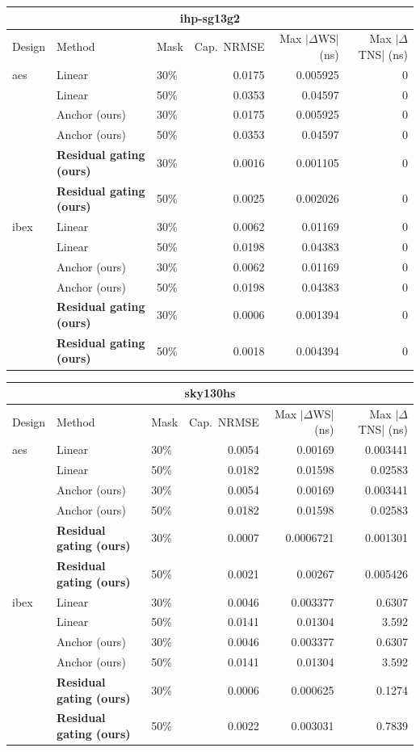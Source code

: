 \small
\begin{tabular}{lllrrr}\toprule
\multicolumn{6}{c}{ihp-sg13g2} \\\midrule
Design & Method & Mask & Cap.\ NRMSE & Max $|\Delta$WS| (ns) & Max $|\Delta$TNS| (ns) \\\midrule
aes & Linear & 30\% & 0.0175 & 0.005925 & 0 \\
 & Linear & 50\% & 0.0353 & 0.04597 & 0 \\
 & Anchor (ours) & 30\% & 0.0175 & 0.005925 & 0 \\
 & Anchor (ours) & 50\% & 0.0353 & 0.04597 & 0 \\
 & \textbf{Residual gating (ours)} & 30\% & 0.0016 & 0.001105 & 0 \\
 & \textbf{Residual gating (ours)} & 50\% & 0.0025 & 0.002026 & 0 \\
\addlinespace
ibex & Linear & 30\% & 0.0062 & 0.01169 & 0 \\
 & Linear & 50\% & 0.0198 & 0.04383 & 0 \\
 & Anchor (ours) & 30\% & 0.0062 & 0.01169 & 0 \\
 & Anchor (ours) & 50\% & 0.0198 & 0.04383 & 0 \\
 & \textbf{Residual gating (ours)} & 30\% & 0.0006 & 0.001394 & 0 \\
 & \textbf{Residual gating (ours)} & 50\% & 0.0018 & 0.004394 & 0 \\
\bottomrule\end{tabular}

\vspace{2pt}

\begin{tabular}{lllrrr}\toprule
\multicolumn{6}{c}{sky130hs} \\\midrule
Design & Method & Mask & Cap.\ NRMSE & Max $|\Delta$WS| (ns) & Max $|\Delta$TNS| (ns) \\\midrule
aes & Linear & 30\% & 0.0054 & 0.00169 & 0.003441 \\
 & Linear & 50\% & 0.0182 & 0.01598 & 0.02583 \\
 & Anchor (ours) & 30\% & 0.0054 & 0.00169 & 0.003441 \\
 & Anchor (ours) & 50\% & 0.0182 & 0.01598 & 0.02583 \\
 & \textbf{Residual gating (ours)} & 30\% & 0.0007 & 0.0006721 & 0.001301 \\
 & \textbf{Residual gating (ours)} & 50\% & 0.0021 & 0.00267 & 0.005426 \\
\addlinespace
ibex & Linear & 30\% & 0.0046 & 0.003377 & 0.6307 \\
 & Linear & 50\% & 0.0141 & 0.01304 & 3.592 \\
 & Anchor (ours) & 30\% & 0.0046 & 0.003377 & 0.6307 \\
 & Anchor (ours) & 50\% & 0.0141 & 0.01304 & 3.592 \\
 & \textbf{Residual gating (ours)} & 30\% & 0.0006 & 0.000625 & 0.1274 \\
 & \textbf{Residual gating (ours)} & 50\% & 0.0022 & 0.003031 & 0.7839 \\
\bottomrule\end{tabular}
